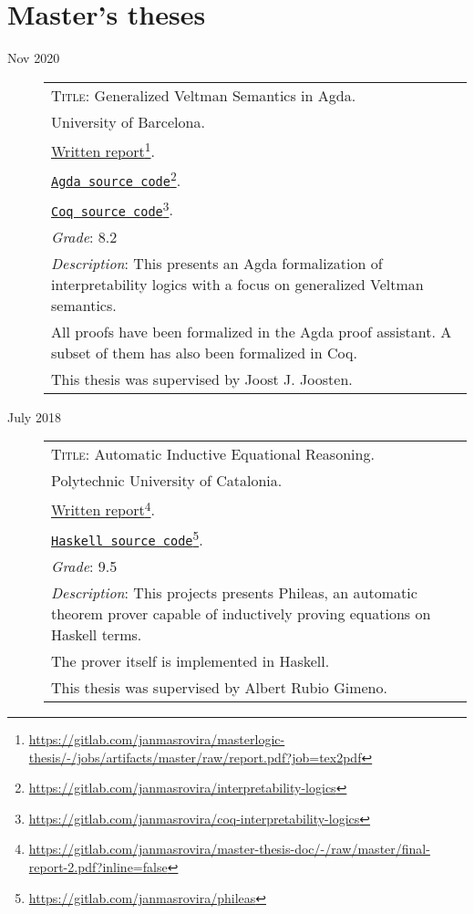 \documentclass[11pt]{article}
\newcommand{\fnlink}[2]{\href{#1}{#2}\footnote{\url{#1}}}
\begin{document}
\section{Master's theses}

\begin{description}
\item[Nov 2020]
\begin{minipage}{\textwidth}

  \begin{tabular}{|p{12cm}}

    \textsc{Title}: Generalized Veltman Semantics in Agda. \\
    University of Barcelona. \\
    \fnlink{https://gitlab.com/janmasrovira/masterlogic-thesis/-/jobs/artifacts/master/raw/report.pdf?job=tex2pdf}{Written report}. \\
    \fnlink{https://gitlab.com/janmasrovira/interpretability-logics}{\texttt{Agda source code}}. \\
    \fnlink{https://gitlab.com/janmasrovira/coq-interpretability-logics}{\texttt{Coq source code}}. \\
    \textit{Grade}: 8.2 \\
    \textit{Description}: This presents an Agda formalization of interpretability logics with a focus on generalized Veltman semantics.
    \\All proofs have been formalized in the Agda proof assistant. A subset of them has also been formalized in Coq.
    \\This thesis was supervised by Joost J. Joosten.

  \end{tabular}
\end{minipage}

\item[July 2018]
  \begin{minipage}{\textwidth}
    \begin{tabular}{|p{12cm}}
      \textsc{Title}: Automatic Inductive Equational Reasoning. \\
      Polytechnic University of Catalonia. \\
      \fnlink{https://gitlab.com/janmasrovira/master-thesis-doc/-/raw/master/final-report-2.pdf?inline=false}{Written report}. \\
      \fnlink{https://gitlab.com/janmasrovira/phileas}{\texttt{Haskell source code}}. \\
      \textit{Grade}: 9.5 \\
      \textit{Description}: This projects presents Phileas, an automatic
      theorem prover capable of inductively proving equations on Haskell
      terms.
      \\The prover itself is implemented in Haskell.
      \\This thesis was supervised by Albert Rubio Gimeno.

    \end{tabular}
  \end{minipage}

\end{description}
\end{document}
